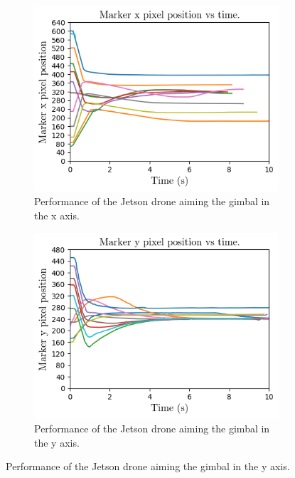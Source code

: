 \begin{figure}
    \centering
    \begin{subfigure}[b]{0.49\textwidth}
        \centering
        \includegraphics[width=\textwidth]{images/jetson_gimbal_performance_x_axis.png}
    \caption{Performance of the Jetson drone aiming the gimbal in the x axis.}
    \label{fig:jetson_gimbal_performance_x_axis}
    \end{subfigure}
    \begin{subfigure}[b]{0.49\textwidth}
        \centering
        \includegraphics[width=\textwidth]{images/jetson_gimbal_performance_y_axis.png}
    \caption{Performance of the Jetson drone aiming the gimbal in the y axis.}
    \label{fig:jetson_gimbal_performance_y_axis}

\end{subfigure}
\end{figure}
